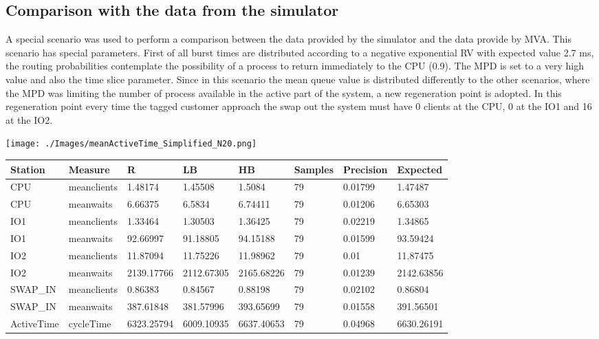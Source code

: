 \documentclass[12pt,a4paper]{article}
\begin{document}
\subsection{Comparison with the data from the simulator}
A special scenario was used to perform a comparison between the data provided by the simulator and the data provide by MVA. This scenario has special parameters. First of all burst times are distributed according to a negative exponential RV with expected value 2.7 ms, the routing probabilities contemplate the possibility of a process to return immediately to the CPU (0.9). The MPD is set to a very high value and also the time slice parameter. Since in this scenario the mean queue value is distributed differently to the other scenarios, where the MPD was limiting the number of process available in the active part of the system, a new regeneration point is adopted. In this regeneration point every time the tagged customer approach the swap out the system must have 0 clients at the CPU, 0 at the IO1 and 16 at the IO2.

\texttt{[image: ./Images/meanActiveTime\_Simplified\_N20.png]}

\begin{table}[!ht]
    \centering
    \begin{tabular}{|l|l|l|l|l|l|l|l|}
    \hline
        Station & Measure & R & LB & HB & Samples & Precision & Expected \\ \hline
        CPU & meanclients & 1.48174 & 1.45508 & 1.5084 & 79 & 0.01799 & 1.47487 \\ \hline
        CPU & meanwaits & 6.66375 & 6.5834 & 6.74411 & 79 & 0.01206 & 6.65303 \\ \hline
        IO1 & meanclients & 1.33464 & 1.30503 & 1.36425 & 79 & 0.02219 & 1.34865 \\ \hline
        IO1 & meanwaits & 92.66997 & 91.18805 & 94.15188 & 79 & 0.01599 & 93.59424 \\ \hline
        IO2 & meanclients & 11.87094 & 11.75226 & 11.98962 & 79 & 0.01 & 11.87475 \\ \hline
        IO2 & meanwaits & 2139.17766 & 2112.67305 & 2165.68226 & 79 & 0.01239 & 2142.63856 \\ \hline
        SWAP\_IN & meanclients & 0.86383 & 0.84567 & 0.88198 & 79 & 0.02102 & 0.86804 \\ \hline
        SWAP\_IN & meanwaits & 387.61848 & 381.57996 & 393.65699 & 79 & 0.01558 & 391.56501 \\ \hline
        ActiveTime & cycleTime & 6323.25794 & 6009.10935 & 6637.40653 & 79 & 0.04968 & 6630.26191 \\ \hline
    \end{tabular}
\end{table}
\end{document}
